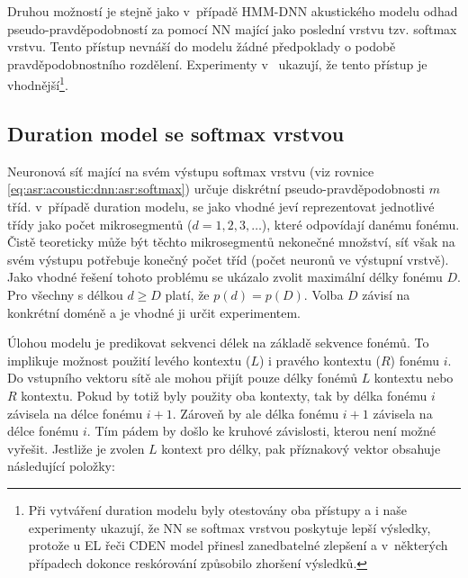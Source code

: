 Druhou možností je stejně jako v~případě HMM-DNN akustického modelu odhad pseudo-pravděpodobností za pomocí NN mající jako poslední vrstvu tzv. softmax vrstvu. Tento přístup nevnáší do modelu žádné předpoklady o podobě pravděpodobnostního rozdělení. Experimenty v~\cite{Hadian2017} ukazují, že tento přístup je vhodnější\footnote{Při vytváření duration modelu byly otestovány oba přístupy a i naše experimenty ukazují, že NN se softmax vrstvou poskytuje lepší výsledky, protože u EL řeči CDEN model přinesl zanedbatelné zlepšení a v~některých případech dokonce reskórování způsobilo zhoršení výsledků.}.

\subsection{Duration model se softmax vrstvou}
\label{chap:realisation:durationmodels:nn:softmax}

Neuronová síť mající na svém výstupu softmax vrstvu (viz rovnice \ref{eq:asr:acoustic:dnn:asr:softmax}) určuje diskrétní pseudo-pravděpodobnosti $m$ tříd. v~případě duration modelu, se jako vhodné jeví reprezentovat jednotlivé třídy jako počet mikrosegmentů ($d=1,2,3,\dots$), které odpovídají danému fonému. Čistě teoreticky může být těchto mikrosegmentů nekonečné množství, síť však na svém výstupu potřebuje konečný počet tříd (počet neuronů ve výstupní vrstvě). Jako vhodné řešení tohoto problému se ukázalo zvolit maximální délky fonému $D$. Pro všechny s délkou $d \geq D$ platí, že $p\left(d\right) = p\left(D\right)$. \cite{Hadian2017} Volba $D$ závisí na konkrétní doméně a je vhodné ji určit experimentem.

Úlohou modelu je predikovat sekvenci délek na základě sekvence fonémů. To implikuje možnost použití levého kontextu ($L$) i pravého kontextu ($R$) fonému $i$. Do vstupního vektoru sítě ale mohou přijít pouze délky fonémů $L$ kontextu  nebo $R$ kontextu. Pokud by totiž byly použity oba kontexty, tak by délka fonému $i$ závisela na délce fonému $i+1$. Zároveň by ale délka fonému $i+1$ závisela na délce fonému $i$. Tím pádem by došlo ke kruhové závislosti, kterou není možné vyřešit. Jestliže je zvolen $L$ kontext pro délky, pak příznakový vektor obsahuje následující položky:

